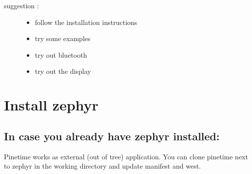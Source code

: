 \documentclass[letterpaper,10pt,english]{sphinxmanual}
\begin{document}
\begin{sphinxVerbatim}[commandchars=\\\{\}]
          
               
        
        
          
\end{sphinxVerbatim}
\begin{description}
\item[{suggestion :}] \leavevmode\begin{itemize}
\item {} 
follow the installation instructions

\item {} 
try some examples

\item {} 
try out bluetooth

\item {} 
try out the display

\end{itemize}

\end{description}

\noindent{}


\chapter{Install zephyr}
\label{\detokenize{installation:install-zephyr}}\label{\detokenize{installation::doc}}

\section{In case you already have zephyr installed:}
\label{\detokenize{installation:in-case-you-already-have-zephyr-installed}}
Pinetime works as external (out of tree) application.
You can clone pinetime next to zephyr in the working directory and update manifest and west.

\begin{sphinxVerbatim}[commandchars=\\\{\}]
   
\end{sphinxVerbatim}
\end{document}
